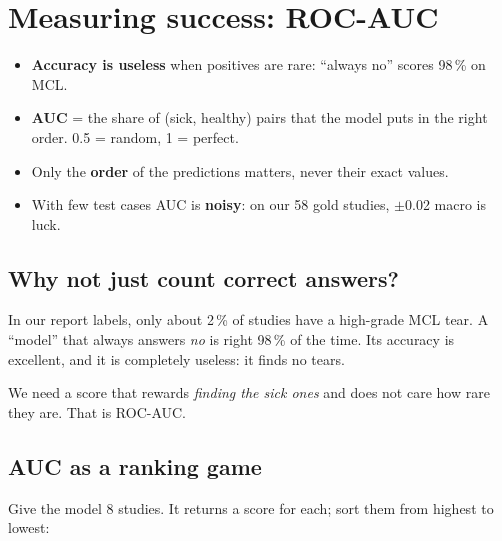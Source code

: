 \chapter{Measuring success: ROC-AUC}
\label{ch:auc}

\begin{tldr}
\begin{itemize}
\item \textbf{Accuracy is useless} when positives are rare: ``always no'' scores 98\,\% on MCL.
\item \textbf{AUC} = the share of (sick, healthy) pairs that the model puts in the right order. 0.5 = random, 1 = perfect.
\item Only the \textbf{order} of the predictions matters, never their exact values.
\item With few test cases AUC is \textbf{noisy}: on our 58 gold studies, $\pm$0.02 macro is luck.
\end{itemize}
\end{tldr}

\section{Why not just count correct answers?}

\begin{example}
In our report labels, only about 2\,\% of studies have a high-grade MCL tear. A ``model'' that always answers
\emph{no} is right 98\,\% of the time. Its accuracy is excellent, and it is completely useless: it finds no tears.
\end{example}

We need a score that rewards \emph{finding the sick ones} and does not care how rare they are. That is ROC-AUC.

\section{AUC as a ranking game}

Give the model 8 studies. It returns a score for each; sort them from highest to lowest:

